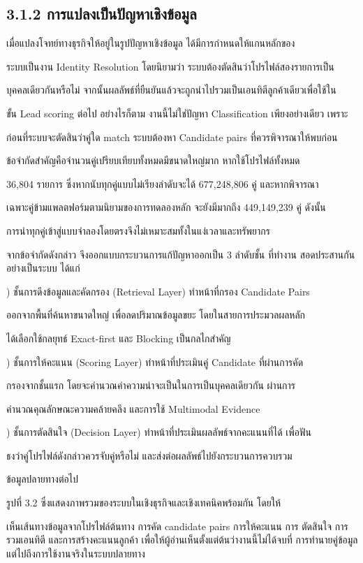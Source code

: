 \documentclass[12pt,a4paper]{report}
\begin{document}
\subsection*{3.1.2 การแปลงเป็นปัญหาเชิงข้อมูล}
เมื่อแปลงโจทย์ทางธุรกิจให้อยู่ในรูปปัญหาเชิงข้อมูล ได้มีการกำหนดให้แกนหลักของ\par
ระบบเป็นงาน Identity Resolution โดยนิยามว่า ระบบต้องตัดสินว่าโปรไฟล์สองรายการเป็น\par
บุคคลเดียวกันหรือไม่ จากนั้นผลลัพธ์ที่ยืนยันแล้วจะถูกนำไปรวมเป็นเอนทิตีลูกค้าเดียวเพื่อใช้ใน\par
ขั้น Lead scoring ต่อไป อย่างไรก็ตาม งานนี้ไม่ใช่ปัญหา Classification เพียงอย่างเดียว เพราะ\par
ก่อนที่ระบบจะตัดสินว่าคู่ใด match ระบบต้องหา Candidate pairs ที่ควรพิจารณาให้พบก่อน\par
ข้อจำกัดสำคัญคือจำนวนคู่เปรียบเทียบทั้งหมดมีขนาดใหญ่มาก หากใช้โปรไฟล์ทั้งหมด\par
36,804 รายการ ซึ่งหากนับทุกคู่แบบไม่เรียงลำดับจะได้ 677,248,806 คู่ และหากพิจารณา\par
\clearpage
เฉพาะคู่ข้ามแพลตฟอร์มตามนิยามของการทดลองหลัก จะยังมีมากถึง 449,149,239 คู่ ดังนั้น\par
การนำทุกคู่เข้าสู่แบบจำลองโดยตรงจึงไม่เหมาะสมทั้งในแง่เวลาและทรัพยากร\par
จากข้อจำกัดดังกล่าว จึงออกแบบกระบวนการแก้ปัญหาออกเป็น 3 ลำดับชั้น ที่ทำงาน สอดประสานกันอย่างเป็นระบบ ได้แก่\par
{}) ชั้นการดึงข้อมูลและคัดกรอง (Retrieval Layer) ทำหน้าที่กรอง Candidate Pairs\par
ออกจากพื้นที่ค้นหาขนาดใหญ่ เพื่อลดปริมาณข้อมูลขยะ โดยในสายการประมวลผลหลัก\par
ได้เลือกใช้กลยุทธ์ Exact-first และ Blocking เป็นกลไกสำคัญ\par
{}) ชั้นการให้คะแนน (Scoring Layer) ทำหน้าที่ประเมินคู่ Candidate ที่ผ่านการคัด\par
กรองจากชั้นแรก โดยจะคำนวณค่าความน่าจะเป็นในการเป็นบุคคลเดียวกัน ผ่านการ\par
คำนวณคุณลักษณะความคล้ายคลึง และการใช้ Multimodal Evidence\par
{}) ชั้นการตัดสินใจ (Decision Layer) ทำหน้าที่ประเมินผลลัพธ์จากคะแนนที่ได้ เพื่อฟัน\par
ธงว่าคู่โปรไฟล์ดังกล่าวควรจับคู่หรือไม่ และส่งต่อผลลัพธ์ไปยังกระบวนการควบรวม\par
ข้อมูลปลายทางต่อไป\par
\begin{center}\small รูปที่ 3.2 ซึ่งแสดงภาพรวมของระบบในเชิงธุรกิจและเชิงเทคนิคพร้อมกัน โดยให้\end{center}
\clearpage
เห็นเส้นทางข้อมูลจากโปรไฟล์ต้นทาง การคัด candidate pairs การให้คะแนน การ ตัดสินใจ การรวมเอนทิตี และการสร้างคะแนนลูกค้า เพื่อให้ผู้อ่านเห็นตั้งแต่ต้นว่างานนี้ไม่ได้จบที่ การทำนายคู่ข้อมูล แต่ไปถึงการใช้งานจริงในระบบปลายทาง\par
\end{document}
